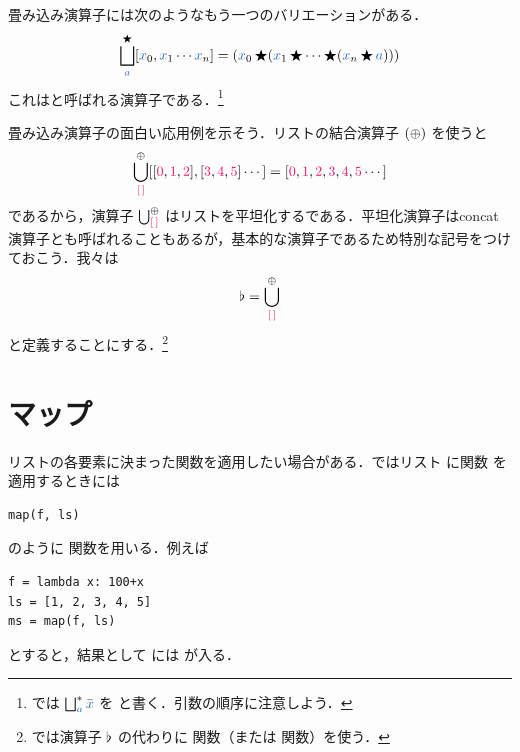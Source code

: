 \documentclass[a5paper,twoside,fleqn,draft]{jsbook}
\begin{document}
\separator

畳み込み演算子には次のようなもう一つのバリエーションがある．
\begin{equation}
  \mFoldRight^{\hAnyBinOp}_{\hVar{a}}[\hVar{x}_0,\hVar{x}_1\dotsb \hVar{x}_n]
  =(\hVar{x}_0\hAnyBinOp(\hVar{x}_1\hAnyBinOp\dotsb\hAnyBinOp(\hVar{x}_n\hAnyBinOp\hVar{a})))
\end{equation}
これはと呼ばれる演算子である．\footnote{\haskell では $\mFoldRight^{*}_{\hVar{a}}\hListVarWith{x}$ を  と書く．引数の順序に注意しよう．}

\separator

畳み込み演算子の面白い応用例を示そう．リストの結合演算子 $(\operatorname{\oplus})$ を使うと
\begin{equation}
  \mFold_\mEmptyList^{\hAppend}[[\hConstant{0},\hConstant{1},\hConstant{2}],[\hConstant{3},\hConstant{4},\hConstant{5}]\dotsb]
  =[\hConstant{0},\hConstant{1},\hConstant{2},\hConstant{3},\hConstant{4},\hConstant{5}\dotsb]
\end{equation}
であるから，演算子 $\mFold_\mEmptyList^{\hAppend}$ はリストを平坦化するである．平坦化演算子はconcat演算子とも呼ばれることもあるが，基本的な演算子であるため特別な記号をつけておこう．我々は
\begin{equation}
  \mJoinList
  =\mFold_\mEmptyList^{\hAppend}
\end{equation}
と定義することにする．\footnote{\haskell では演算子 $\operatorname{\flat}$ の代わりに  関数（または  関数）を使う．}

\section{マップ}

リストの各要素に決まった関数を適用したい場合がある．\python ではリスト  に関数  を適用するときには
\begin{pythoncode}
\begin{verbatim}
map(f, ls)
\end{verbatim}
\end{pythoncode}
のように  関数を用いる．例えば
\begin{pythoncode}
\begin{verbatim}
f = lambda x: 100+x
ls = [1, 2, 3, 4, 5]
ms = map(f, ls)
\end{verbatim}
\end{pythoncode}
とすると，結果として  には \code{[101, 102, 103, 104, 105]} が入る．
\end{document}
